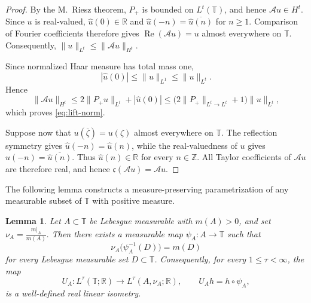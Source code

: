 \documentclass[11pt, reqno]{amsart}
\newtheorem{lemma}[theorem]{Lemma}
\theoremstyle{definition}
\theoremstyle{remark}
\newcommand{\T}{\mathbb{T}}
\newcommand{\R}{\mathbb{R}}
\begin{document}
\begin{proof}
By the M.~Riesz theorem, \(P_+\) is bounded on \(L^t(\T)\), and hence
\(\mathcal Au\in H^t\). Since \(u\) is real-valued,
\(\widehat u(0)\in\mathbb R\) and
\(\widehat u(-n)=\overline{\widehat u(n)}\) for \(n\ge1\).
Comparison of Fourier coefficients therefore gives
\(\operatorname{Re}(\mathcal Au)=u\) almost everywhere on \(\T\).
Consequently,
\(
\|u\|_{L^t}\le\|\mathcal Au\|_{H^t}.
\)

Since normalized Haar measure has total mass one,
\[
        |\widehat u(0)|
        \le
        \|u\|_{L^1}
        \le
        \|u\|_{L^t}.
\]
Hence
\[
        \|\mathcal Au\|_{H^t}
        \le
        2\|P_+u\|_{L^t}+|\widehat u(0)|
        \le
        \bigl(2\|P_+\|_{L^t\to L^t}+1\bigr)\|u\|_{L^t},
\]
which proves \eqref{eq:lift-norm}.

Suppose now that
\(u(\overline\zeta)=u(\zeta)\) almost everywhere on \(\T\).
The reflection symmetry gives
\(\widehat u(-n)=\widehat u(n)\), while the real-valuedness of \(u\)
gives
\(\widehat u(-n)=\overline{\widehat u(n)}\).
Thus \(\widehat u(n)\in\mathbb R\) for every \(n\in\mathbb Z\).
All Taylor coefficients of \(\mathcal Au\) are therefore real, and
hence
\(\mathfrak c(\mathcal Au)=\mathcal Au\).
\end{proof}

The following lemma constructs a measure-preserving parametrization
of any measurable subset of \(\T\) with positive measure.

\begin{lemma}
\label{lem:mp-param}
Let \(A\subset\T\) be Lebesgue measurable with \(m(A)>0\), and set
\(\nu_A=\frac{m|_A}{m(A)}.
\)
Then there exists a measurable map
\(\psi_A:A\to\T\) such that
\[
        \nu_A\bigl(\psi_A^{-1}(D)\bigr)=m(D)
\]
for every Lebesgue measurable set \(D\subset\T\). Consequently, for
every \(1\le\tau<\infty\), the map
\[
        U_A:L^\tau(\T;\R)\to L^\tau(A,\nu_A;\R),
        \qquad
        U_Ah=h\circ\psi_A,
\]
is a well-defined real linear isometry.
\end{lemma}
\end{document}
